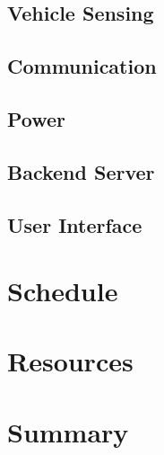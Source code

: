 \documentclass[letterpaper,10 pt,conference,onecolumn]{IEEEtran}
\begin{document}
		\subsection{Vehicle Sensing}
		
		\subsection{Communication}
		
		\subsection{Power}
		
		\subsection{Backend Server}
		
		\subsection{User Interface}
		
	\section{Schedule}
		
		
	\section{Resources}
		
		
	\section{Summary}
 		
		
	
	
	
\end{document}
